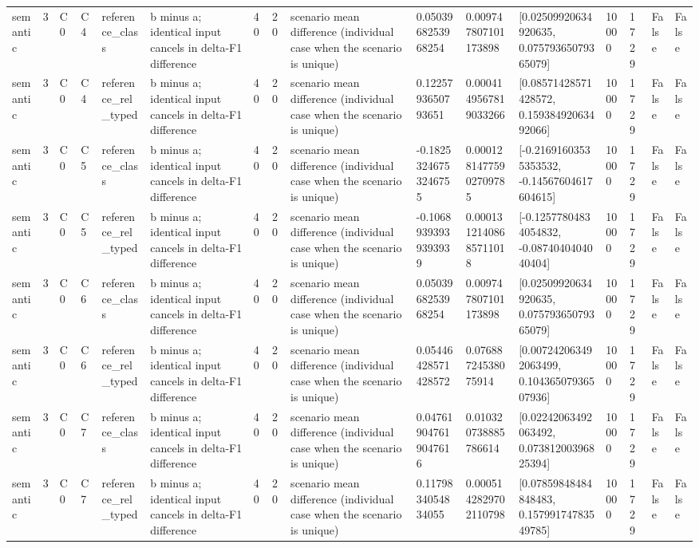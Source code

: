 \begin{tabular}{llllllllllllllll}
semantic & 3 & C0 & C4 & reference\_class & b minus a; identical input cancels in delta-F1 difference & 40 & 20 & scenario mean difference (individual case when the scenario is unique) & 0.0503968253968254 & 0.009747807101173898 & [0.02509920634920635, 0.07579365079365079] & 10000 & 1729 & False & False \\
semantic & 3 & C0 & C4 & reference\_rel\_typed & b minus a; identical input cancels in delta-F1 difference & 40 & 20 & scenario mean difference (individual case when the scenario is unique) & 0.1225793650793651 & 0.0004149567819033266 & [0.08571428571428572, 0.15938492063492066] & 10000 & 1729 & False & False \\
semantic & 3 & C0 & C5 & reference\_class & b minus a; identical input cancels in delta-F1 difference & 40 & 20 & scenario mean difference (individual case when the scenario is unique) & -0.18253246753246755 & 0.00012814775902709785 & [-0.21691603535353532, -0.14567604617604615] & 10000 & 1729 & False & False \\
semantic & 3 & C0 & C5 & reference\_rel\_typed & b minus a; identical input cancels in delta-F1 difference & 40 & 20 & scenario mean difference (individual case when the scenario is unique) & -0.10689393939393939 & 0.00013121408685711018 & [-0.12577804834054832, -0.0874040404040404] & 10000 & 1729 & False & False \\
semantic & 3 & C0 & C6 & reference\_class & b minus a; identical input cancels in delta-F1 difference & 40 & 20 & scenario mean difference (individual case when the scenario is unique) & 0.0503968253968254 & 0.009747807101173898 & [0.02509920634920635, 0.07579365079365079] & 10000 & 1729 & False & False \\
semantic & 3 & C0 & C6 & reference\_rel\_typed & b minus a; identical input cancels in delta-F1 difference & 40 & 20 & scenario mean difference (individual case when the scenario is unique) & 0.05446428571428572 & 0.07688724538075914 & [0.007242063492063499, 0.10436507936507936] & 10000 & 1729 & False & False \\
semantic & 3 & C0 & C7 & reference\_class & b minus a; identical input cancels in delta-F1 difference & 40 & 20 & scenario mean difference (individual case when the scenario is unique) & 0.047619047619047616 & 0.010320738885786614 & [0.02242063492063492, 0.07381200396825394] & 10000 & 1729 & False & False \\
semantic & 3 & C0 & C7 & reference\_rel\_typed & b minus a; identical input cancels in delta-F1 difference & 40 & 20 & scenario mean difference (individual case when the scenario is unique) & 0.1179834054834055 & 0.0005142829702110798 & [0.07859848484848483, 0.15799174783549785] & 10000 & 1729 & False & False \\

\end{tabular}
